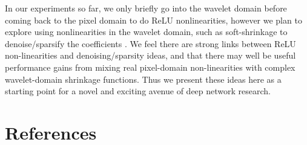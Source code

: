 \documentclass[9pt]{article}
\begin{document}
In our experiments so far, we only briefly go into the wavelet domain before coming back to the
pixel domain to do ReLU nonlinearities, however we plan to explore using nonlinearities in the
wavelet domain, such as soft-shrinkage to denoise/sparsify the coefficients
\cite{donoho_ideal_1994}. We feel there are strong links between ReLU non-linearities and
denoising/sparsity ideas, and that there may well be useful performance gains from mixing real
pixel-domain non-linearities with complex wavelet-domain shrinkage functions. Thus we present these
ideas here as a starting point for a novel and exciting avenue of deep network research.



%

\section*{References}
\printbibliography[heading=none]
\end{document}
